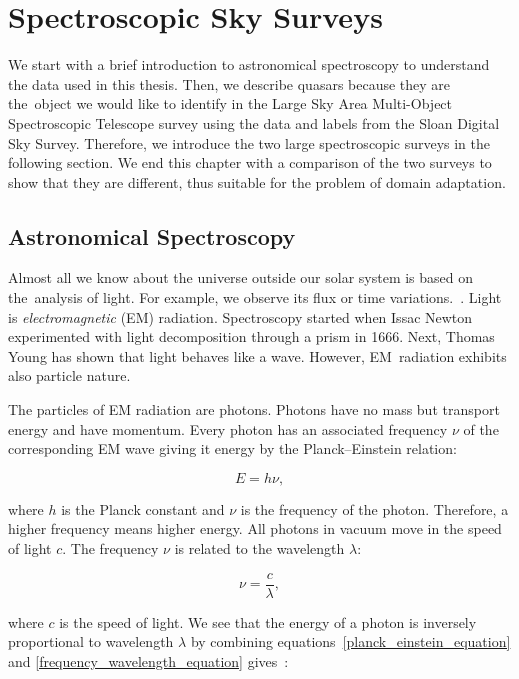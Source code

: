 \chapter{Spectroscopic Sky Surveys}
\label{data_chapter}

We start with a brief introduction to astronomical spectroscopy to understand the data used in this thesis.
Then, we describe quasars because they are the~object we would like to identify in the Large Sky Area Multi-Object Spectroscopic Telescope survey using the data and labels from the Sloan Digital Sky Survey.
Therefore, we introduce the two large spectroscopic surveys in the following section.
We end this chapter with a comparison of the two surveys to show
that they are different, thus suitable for the problem of domain adaptation.

\section{Astronomical Spectroscopy}

Almost all we know about the universe outside our solar system is based on the~analysis of light.
For example, we observe its flux or time variations.~\cite{appenzeller2012}.
Light is \textit{electromagnetic} (EM) radiation.
Spectroscopy started when Issac Newton experimented with light decomposition through a prism in 1666.
Next, Thomas Young has shown that light behaves like a wave.
However, EM~radiation exhibits also particle nature.

The particles of EM radiation are photons.
Photons have no mass but transport energy and have momentum.
Every photon has an associated frequency \(\nu\) of the corresponding EM wave
giving it energy by the Planck--Einstein relation:

\begin{equation}
	E = h \nu,
	\label{planck_einstein_equation}
\end{equation}

where \(h\) is the Planck constant and \(\nu\) is the frequency of the photon.
Therefore, a higher frequency means higher energy.
All photons in vacuum move in the speed of light \(c\).
The frequency \(\nu\) is related to the wavelength \(\lambda\):

\begin{equation}
	\nu = \frac{c}{\lambda},
	\label{frequency_wavelength_equation}
\end{equation}

where \(c\) is the speed of light.
We see that the energy of a photon is inversely proportional to wavelength \(\lambda\) by combining equations~\ref{planck_einstein_equation} and \ref{frequency_wavelength_equation} gives~\cite{trypsteen2017}:

